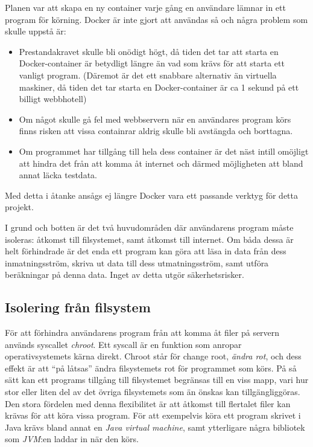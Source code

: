 \documentclass{article}
\begin{document}
Planen var att skapa en ny container varje gång en användare lämnar in ett
program för körning. Docker är inte gjort att användas så och några problem som
skulle uppstå är:
\begin{itemize}
	\item Prestandakravet skulle bli onödigt högt, då tiden det tar att starta
		en Docker-container är betydligt längre än vad som krävs för att starta
		ett vanligt program. (Däremot är det ett snabbare alternativ än
		virtuella maskiner, då tiden det tar starta en Docker-container är ca
		1 sekund på ett billigt webbhotell)
	\item Om något skulle gå fel med webbservern när en användares program körs
		finns risken att vissa containrar aldrig skulle bli avstängda och
		borttagna.
	\item Om programmet har tillgång till hela dess container är det näst
		intill omöjligt att hindra det från att komma åt internet och därmed
		möjligheten att bland annat läcka testdata.
\end{itemize}
Med detta i åtanke ansågs ej längre Docker vara ett passande verktyg för detta
projekt.

I grund och botten är det två huvudområden där användarens program måste
isoleras: åtkomst till filsystemet, samt åtkomst till internet. Om båda dessa är
helt förhindrade är det enda ett program kan göra att läsa in data från dess
inmatningsström, skriva ut data till dess utmatningsström, samt utföra
beräkningar på denna data. Inget av detta utgör säkerhetsrisker.

\subsection{Isolering från filsystem}

För att förhindra användarens program från att komma åt filer på servern används
syscallet \textit{chroot}. Ett syscall är en funktion som anropar
operativsystemets kärna direkt. Chroot står för change root,
\textit{ändra rot}, och dess effekt är att ``på låtsas'' ändra filsystemets rot
för programmet som körs. På så sätt kan ett programs tillgång till filsystemet
begränsas till en viss mapp, vari hur stor eller liten del av det övriga
filsystemets som än önskas kan tillgängliggöras. Den stora fördelen med denna
flexibilitet är att åtkomst till flertalet filer kan krävas för att köra vissa
program. För att exempelvis köra ett program skrivet i Java krävs bland annat en
\textit{Java virtual machine}, samt ytterligare några bibliotek som
\textit{JVM}:en laddar in när den körs.
\end{document}

